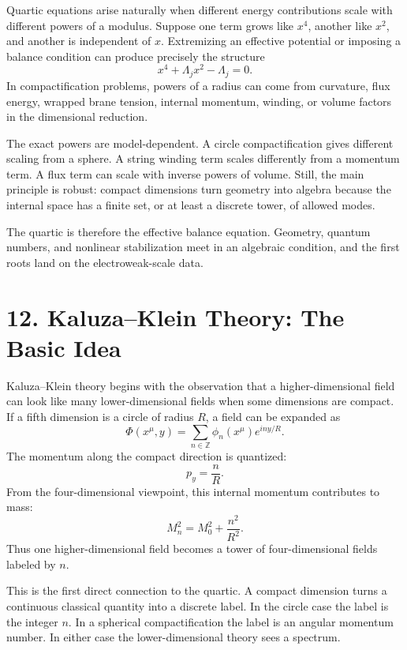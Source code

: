 \documentclass[11pt]{article}
\newcommand{\Lspin}{\Lambda_j}
\begin{document}
Quartic equations arise naturally when different energy contributions scale with different powers of a modulus. Suppose one term grows like \(x^4\), another like \(x^2\), and another is independent of \(x\). Extremizing an effective potential or imposing a balance condition can produce precisely the structure
\[
        x^4+\Lspin x^2-\Lspin=0 .
\]
In compactification problems, powers of a radius can come from curvature, flux energy, wrapped brane tension, internal momentum, winding, or volume factors in the dimensional reduction.

The exact powers are model-dependent. A circle compactification gives different scaling from a sphere. A string winding term scales differently from a momentum term. A flux term can scale with inverse powers of volume. Still, the main principle is robust: compact dimensions turn geometry into algebra because the internal space has a finite set, or at least a discrete tower, of allowed modes.

The quartic is therefore the effective balance equation. Geometry, quantum numbers, and nonlinear stabilization meet in an algebraic condition, and the first roots land on the electroweak-scale data.


\section*{12. Kaluza--Klein Theory: The Basic Idea}

Kaluza--Klein theory begins with the observation that a higher-dimensional field can look like many lower-dimensional fields when some dimensions are compact. If a fifth dimension is a circle of radius \(R\), a field can be expanded as
\[
        \Phi(x^\mu,y)=\sum_{n\in\mathbb{Z}}\phi_n(x^\mu)e^{iny/R}.
\]
The momentum along the compact direction is quantized:
\[
        p_y=\frac{n}{R}.
\]
From the four-dimensional viewpoint, this internal momentum contributes to mass:
\begin{equation}
        M_n^2=M_0^2+\frac{n^2}{R^2}.
        \label{eq:kkcircle}
\end{equation}
Thus one higher-dimensional field becomes a tower of four-dimensional fields labeled by \(n\).

This is the first direct connection to the quartic. A compact dimension turns a continuous classical quantity into a discrete label. In the circle case the label is the integer \(n\). In a spherical compactification the label is an angular momentum number. In either case the lower-dimensional theory sees a spectrum.
\end{document}
